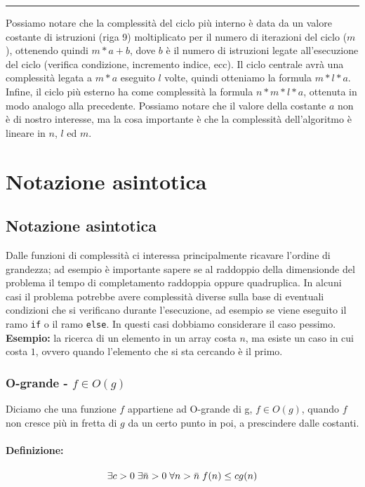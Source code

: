 \documentclass[a4paper,12pt,twoside]{report}
\newcommand\hlin{\noindent\rule[0.5ex]{\linewidth}{1pt}}
\begin{document}
\hlin

Possiamo notare che la complessit\`{a} del ciclo pi\`{u} interno \`{e} data da un
valore costante di istruzioni (riga 9) moltiplicato per il numero di iterazioni 
del ciclo ($m$), ottenendo quindi $m*a+b$, dove $b$ \`{e} il numero di istruzioni 
legate all'esecuzione del ciclo (verifica condizione, incremento indice, ecc).
Il ciclo centrale avr\`{a} una complessit\`{a} legata a $m*a$ eseguito $l$ volte, 
quindi otteniamo la formula $m*l*a$. Infine, il ciclo pi\`{u} esterno ha come complessit\`{a} la formula $n*m*l*a$, ottenuta in modo analogo alla precedente. Possiamo notare che il valore della costante $a$ non \`{e} di nostro interesse, ma la cosa importante \`{e} che la complessit\`{a} dell'algoritmo \`{e} lineare in $n$, $l$ ed $m$.

\chapter{Notazione asintotica}
\section{Notazione asintotica}
Dalle funzioni di complessit\`{a} ci interessa principalmente ricavare l'ordine di grandezza; ad esempio \`{e} importante sapere se al raddoppio della dimensionde del problema il tempo di completamento raddoppia oppure quadruplica.
In alcuni casi il problema potrebbe avere complessit\`{a} diverse sulla base di 
eventuali condizioni che si verificano durante l'esecuzione, ad esempio se viene eseguito il ramo \texttt{if} o il ramo \texttt{else}. In questi casi dobbiamo considerare il caso pessimo. \\
\textbf{Esempio:} la ricerca di un elemento in un array costa $n$, ma esiste 
un caso in cui costa $1$, ovvero quando l'elemento che si sta cercando \`{e} il primo.

\subsection{O-grande - $f \in O(g)$}
Diciamo che una funzione $f$ appartiene ad O-grande di g, $f \in O(g)$, quando $f$ non cresce pi\`{u} in fretta di $g$ da un certo punto in poi, a prescindere dalle costanti.
\subsubsection{Definizione:}
\[ \exists c>0 \thickspace \exists \bar{n}>0 \thickspace \forall n>\bar{n} \thickspace f(n) \le cg(n) \]
\end{document}
